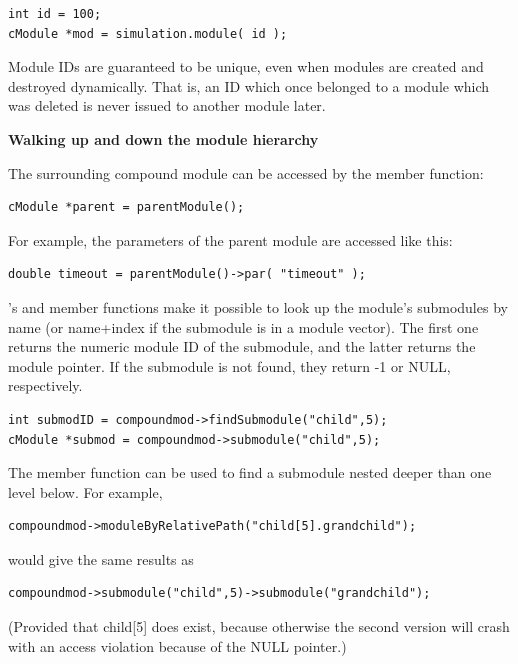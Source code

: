 \begin{verbatim}
int id = 100;
cModule *mod = simulation.module( id );
\end{verbatim}


Module IDs are guaranteed to be unique, even when modules are
created and destroyed dynamically. That is, an ID which once
belonged to a module which was deleted is never issued to another
module later.


\textbf{Walking up and down the module hierarchy}


The surrounding compound module can be accessed by the
 member function:

\begin{verbatim}
cModule *parent = parentModule();
\end{verbatim}

For example, the parameters of the parent module are accessed
like this:

\begin{verbatim}
double timeout = parentModule()->par( "timeout" );
\end{verbatim}


's  and 
member functions make it possible to look up the module's submodules
by name (or name+index if the submodule
is in a module vector). The first one returns the numeric module ID of
the submodule, and the latter returns the module pointer.  If the
submodule is not found, they return -1 or NULL, respectively.

\begin{verbatim}
int submodID = compoundmod->findSubmodule("child",5);
cModule *submod = compoundmod->submodule("child",5);
\end{verbatim}


The  member function can be used to find
a submodule nested deeper than one level below. For example,

\begin{verbatim}
compoundmod->moduleByRelativePath("child[5].grandchild");
\end{verbatim}

would give the same results as

\begin{verbatim}
compoundmod->submodule("child",5)->submodule("grandchild");
\end{verbatim}

(Provided that child[5] does exist, because otherwise the second
version will crash with an access violation because of the NULL
pointer.)


